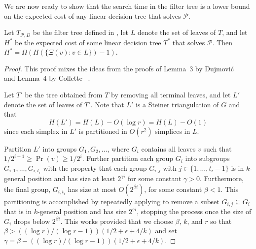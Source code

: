\documentclass{patmorin}
\begin{document}
We are now ready to show that the search time in the filter tree
is a lower bound on the expected cost of any linear decision tree that
solves $\mathcal{P}$.

\begin{lem}
  Let $T_{\mathcal{P},D}$ be the filter tree defined in
  , let $L$ denote the set of leaves of $T$,
  and let $H^*$ be the expected cost of some linear decision tree $T^*$
  that solves $\mathcal{P}$.  Then $H^* = \Omega(H(\{\Xi(v):v\in L\})-1)$.
\end{lem}

\begin{proof}
  This proof mixes the ideas from the proofs of Lemma~3 by Dujmovi\'c
  \etal\ \cite{dhm09} and Lemma~4 by Collette \etal\ \cite{cdilm08}.

  Let $T'$ be the tree obtained from $T$ by removing all terminal leaves,
  and let $L'$ denote the set of leaves of $T'$.  Note that $L'$ is a Steiner
  triangulation of $G$ and that 
  \[  
     H(L') = H(L) - O(\log r) = H(L) - O(1)
  \]
  since each simplex in $L'$ is partitioned in $O(r^2)$ simplices in $L$. 

  Partition $L'$ into groups $G_1,G_2,\ldots$, where $G_i$
  contains all leaves $v$ such that $1/2^{i-1} \ge \Pr(v) \ge
  1/2^{i}$.  Further partition each group $G_i$ into subgroups
  $G_{i,1},\ldots,G_{i,t_i}$ with the property that each group $G_{i,j}$
  with $j\in\{1,\ldots,t_i-1\}$ is in $k$-general position and has size
  at least $2^{\gamma i}$ for some constant $\gamma > 0$. Furthermore,
  the final group, $G_{i,t_i}$ has size at most $O(2^{\beta i})$, for some
  constant $\beta < 1$.  This partitioning is accomplished by repeatedly
  applying  to remove a subset $G_{i,j}\subseteq
  G_{i}$ that is in $k$-general position and has size $2^{\gamma i}$,
  stopping the process once the size of $G_i$ drops below $2^{\beta
  i}$. This works provided that we choose $\beta$, $k$, and $r$ so
  that $\beta > ((\log r)/(\log r - 1))(1/2+\epsilon+4/k)$ and set
  $\gamma=\beta - ((\log r)/(\log r - 1))(1/2+\epsilon+4/k)$.


\end{proof}
\end{document}
